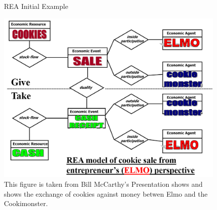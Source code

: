 \begin{figure}
	\centering
	\caption{REA Initial Example}
	\label{fig:rea-initial-example-taken-from-bill-mccarthys-presentation}
	\includegraphics[width=0.7\linewidth]{"../figures/REA Initial Example taken from Bill McCarthy's Presentation"}
	\caption*{This figure is taken from Bill McCarthy's Presentation\cite{mccarthy2004elmo-cookie-monster} shows and shows the exchange of cookies against money betwen Elmo and the Cookimonster.}
\end{figure}

